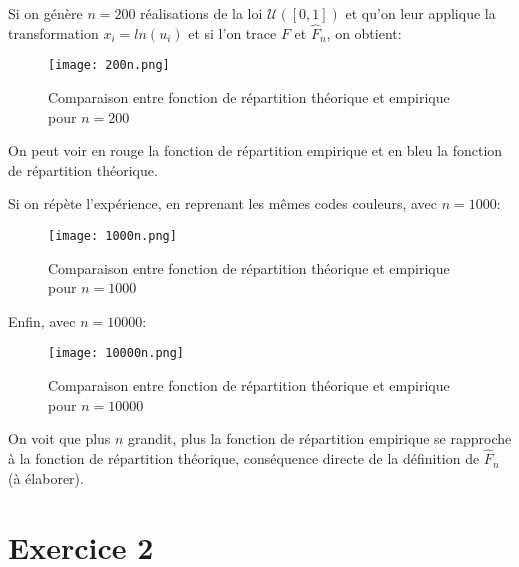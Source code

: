 \documentclass{article}
\begin{document}
\begin{multicols}{2}
Si on génère $n = 200$ réalisations de la loi $\mathcal{U}([0, 1])$ et qu'on
leur applique la transformation $x_i = ln(u_i)$ et si l'on trace $F$ et
$\hat{F}_n$, on obtient:

\begin{figure}[H]
    \begin{center}
        \texttt{[image: 200n.png]}
        \centering
        \captionsetup{justification=centering}
        \caption{\label{fig:200n}Comparaison entre fonction de répartition théorique et empirique pour $n = 200$}
    \end{center}
\end{figure}

On peut voir en rouge la fonction de répartition empirique et en bleu la
fonction de répartition théorique.

Si on répète l'expérience, en reprenant les mêmes codes couleurs, avec
$n = 1000$:

\begin{figure}[H]
    \begin{center}
        \texttt{[image: 1000n.png]}
        \centering
        \captionsetup{justification=centering}
        \caption{\label{fig:1000n}Comparaison entre fonction de répartition théorique et empirique pour $n = 1000$}
    \end{center}
\end{figure}

Enfin, avec $n = 10000$:

\begin{figure}[H]
    \begin{center}
        \texttt{[image: 10000n.png]}
        \centering
        \captionsetup{justification=centering}
        \caption{\label{fig:10000n}Comparaison entre fonction de répartition théorique et empirique pour $n = 10000$}
    \end{center}
\end{figure}

On voit que plus $n$ grandit, plus la fonction de répartition empirique se
rapproche à la fonction de répartition théorique, conséquence directe de la
définition de $\hat{F}_n$ (à élaborer).


\section{Exercice 2}\label{sec:ex2}


\end{multicols}
\end{document}
